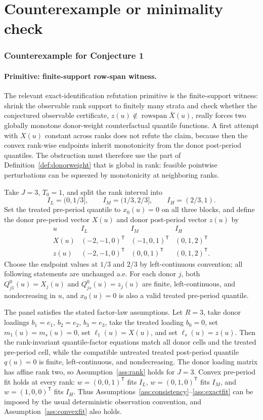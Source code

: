 \documentclass[11pt]{article}
\newcommand{\transpose}{\mathsf{T}}
\theoremstyle{definition}
\theoremstyle{plain}
\theoremstyle{remark}
\begin{document}
\section{Counterexample or minimality check}
\subsubsection*{Counterexample for Conjecture 1}
\paragraph{Primitive: finite-support row-span witness.}
The relevant exact-identification refutation primitive is the finite-support witness: shrink the observable rank support to finitely many strata and check whether the conjectured observable certificate, \(z(u)\notin\operatorname{rowspan}\bar X(u)\), really forces two globally monotone donor-weight counterfactual quantile functions.
A first attempt with \(X(u)\) constant across ranks does not refute the claim, because then the convex rank-wise endpoints inherit monotonicity from the donor post-period quantiles.
The obstruction must therefore use the part of Definition~\ref{def:donorweight} that is global in rank: feasible pointwise perturbations can be squeezed by monotonicity at neighboring ranks.

Take \(J=3\), \(T_0=1\), and split the rank interval into
\[
I_L=(0,1/3],\qquad I_M=(1/3,2/3],\qquad I_H=(2/3,1).
\]
Set the treated pre-period quantile to \(x_0(u)=0\) on all three blocks, and define the donor pre-period vector \(X(u)\) and donor post-period vector \(z(u)\) by
\[
\begin{array}{c|ccc}
u & I_L & I_M & I_H\\ \hline
X(u) & (-2,-1,0)^\transpose & (-1,0,1)^\transpose & (0,1,2)^\transpose\\
z(u) & (-2,-1,0)^\transpose & (0,0,1)^\transpose & (0,1,2)^\transpose .
\end{array}
\]
Choose the endpoint values at \(1/3\) and \(2/3\) by left-continuous convention; all following statements are unchanged a.e.
For each donor \(j\), both \(Q^0_{j1}(u)=X_j(u)\) and \(Q^0_{js}(u)=z_j(u)\) are finite, left-continuous, and nondecreasing in \(u\), and \(x_0(u)=0\) is also a valid treated pre-period quantile.

The panel satisfies the stated factor-law assumptions.
Let \(R=3\), take donor loadings \(b_1=e_1\), \(b_2=e_2\), \(b_3=e_3\), take the treated loading \(b_0=0\), set \(m_1(u)=m_s(u)=0\), set \(\ell_1(u)=X(u)\), and set \(\ell_s(u)=z(u)\).
Then the rank-invariant quantile-factor equations match all donor cells and the treated pre-period cell, while the compatible untreated treated post-period quantile \(q(u)=0\) is finite, left-continuous, and nondecreasing.
The donor loading matrix has affine rank two, so Assumption~\ref{ass:rank} holds for \(J=3\).
Convex pre-period fit holds at every rank: \(w=(0,0,1)^\transpose\) fits \(I_L\), \(w=(0,1,0)^\transpose\) fits \(I_M\), and \(w=(1,0,0)^\transpose\) fits \(I_H\).
Thus Assumptions~\ref{ass:consistency}--\ref{ass:exactfit} can be imposed by the usual deterministic observation convention, and Assumption~\ref{ass:convexfit} also holds.
\end{document}
